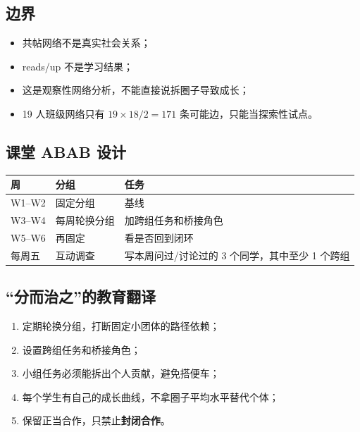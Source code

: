 \documentclass[UTF8,a4paper,11pt]{ctexart}
\begin{document}
\subsection{边界}

\begin{itemize}[leftmargin=2em]
\item 共帖网络不是真实社会关系；
\item reads/up 不是学习结果；
\item 这是观察性网络分析，不能直接说拆圈子导致成长；
\item 19 人班级网络只有 $19\times18/2=171$ 条可能边，只能当探索性试点。
\end{itemize}

\subsection{课堂 ABAB 设计}

\begin{center}
\begin{longtable}{@{}p{2.0cm}p{4.0cm}p{7.0cm}@{}}
\toprule
\textbf{周} & \textbf{分组} & \textbf{任务} \\
\midrule
W1--W2 & 固定分组 & 基线 \\
W3--W4 & 每周轮换分组 & 加跨组任务和桥接角色 \\
W5--W6 & 再固定 & 看是否回到闭环 \\
每周五 & 互动调查 & 写本周问过/讨论过的 3 个同学，其中至少 1 个跨组 \\
\bottomrule
\end{longtable}
\end{center}

\subsection{“分而治之”的教育翻译}

\begin{enumerate}[leftmargin=2em]
\item 定期轮换分组，打断固定小团体的路径依赖；
\item 设置跨组任务和桥接角色；
\item 小组任务必须能拆出个人贡献，避免搭便车；
\item 每个学生有自己的成长曲线，不拿圈子平均水平替代个体；
\item 保留正当合作，只禁止\textbf{封闭合作}。
\end{enumerate}

\newpage
\end{document}
